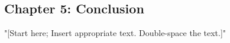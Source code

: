 \newpage
\begin{singlespace}
\section{\protect \centering Chapter 5: Conclusion}
\end{singlespace}
\doublespacing
\noindent "[Start here; Insert appropriate text. Double-space the text.]"